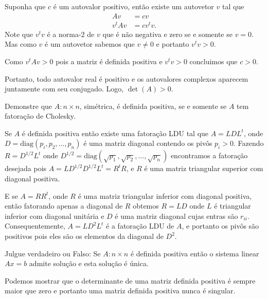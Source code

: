 \documentclass[a4paper,12pt, leqno, answers]{exam}
\begin{document}
\begin{questions}
\begin{solution}
        Suponha que $c$ \'{e} um autovalor positivo, ent\~{a}o existe um autovetor $v$ tal que
        \begin{align*}
            A v &= c v \\
            v^t A v &= c v^t v.
        \end{align*}
        Note que $v^t v$ \'{e} a norma-2 de $v$ que \'{e} n\~{a}o negativa e zero se e somente se $v = 0$. Mas como $v$ \'{e} um autovetor sabemos que $v \neq 0$ e portanto $v^t v > 0$.

        Como $v^t A v > 0$ pois a matriz \'{e} definida positiva e $v^t v > 0$ concluimos que $c > 0$.

        Portanto, todo autovalor real \'{e} positivo e os autovalores complexos aparecem juntamente com seu conjugado. Logo, $\det(A) > 0$.
    \end{solution}

     Demonstre que $A : n \times n$, sim\'{e}trica, \'{e} definida positiva, se e somente se $A$ tem fatora\c{c}\~{a}o de Cholesky.
    \begin{solution}
        Se $A$ \'{e} definida positiva ent\~{a}o existe uma fatora\c{c}\~{a}o LDU tal que $A = L D L^t$, onde $D = \text{diag}(p_i, p_2, \ldots, p_n)$ \'{e} uma matriz diagonal contendo os pivôs $p_i > 0$. Fazendo $R = D^{1/2} L^t$ onde $D^{1/2} = \text{diag}(\sqrt{p_1}, \sqrt{p_2}, \ldots, \sqrt{p_n})$ encontramos a fatora\c{c}\~{a}o desejada pois $A = L D^{1/2} D^{1/2} L^t = R^t R$, e $R$ \'{e} uma matriz triangular superior com diagonal positiva.
        
        E se $A = R R^t$, onde $R$ \'{e} uma matriz triangular inferior com diagonal positiva, ent\~{a}o fatorando apenas a diagonal de $R$ obtemos $R = L D$ onde $L$ \'{e} triangular inferior com diagonal unit\'{a}ria e $D$ \'{e} uma matriz diagonal cujas entras s\~{a}o $r_{ii}$. Consequentemente, $A = L D^2 L^t$ \'{e} a fatora\c{c}\~{a}o LDU de $A$, e portanto os pivôs s\~{a}o positivos pois eles s\~{a}o os elementos da diagonal de $D^2$.
    \end{solution}

    \question Julgue verdadeiro ou Falso: Se $A : n \times n$ \'{e} definida positiva ent\~{a}o o sistema linear $A x = b$ admite solu\c{c}\~{a}o e esta solu\c{c}\~{a}o \'{e} \'{u}nica.
    \begin{solution}
        Podemos mostrar que o determinante de uma matriz definida positiva \'{e} sempre maior que zero e portanto uma matriz definida positiva nunca \'{e} singular.


\end{solution}
\end{questions}
\end{document}
